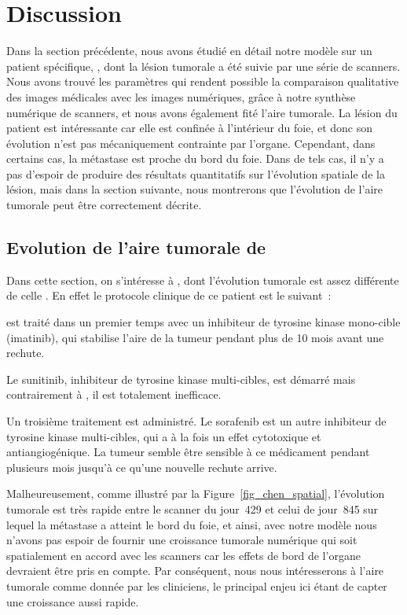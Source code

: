 \documentclass[main.tex]{subfiles}
\begin{document}
\section{Discussion}
Dans la section précédente, nous avons étudié en détail notre modèle sur un patient spécifique, \Nber, dont la lésion tumorale a été suivie par une série de scanners. Nous avons trouvé les paramètres qui rendent possible la comparaison qualitative des images médicales avec les images numériques, grâce à notre synthèse numérique de scanners, et nous avons également fité l'aire tumorale. La lésion du patient est intéressante car elle est confinée à l'intérieur du foie, et donc son évolution n'est pas mécaniquement contrainte par l'organe. 
Cependant, dans certains cas, la métastase est proche du bord du foie. Dans de tels cas, il n'y a pas d'espoir de produire des résultats quantitatifs sur l'évolution spatiale de la lésion, mais dans la section suivante, nous montrerons que l'évolution de l'aire tumorale peut être correctement décrite.
\subsection{Evolution de l'aire tumorale de \Chen}\label{section chen}
Dans cette section, on s'intéresse à \Chen, dont l'évolution tumorale est assez différente de celle \Nber. En effet le protocole clinique de ce patient est le suivant~:
\begin{myenumerate}[label=\roman*)]
\item \Chen est traité dans un premier temps avec un inhibiteur de tyrosine kinase mono-cible (imatinib), qui stabilise l'aire de la tumeur pendant plus de 10 mois avant une rechute. 
\item Le sunitinib, inhibiteur de tyrosine kinase multi-cibles, est démarré mais contrairement à \Nber, il est totalement inefficace. 
\item Un troisième traitement est administré. Le sorafenib est un autre inhibiteur de tyrosine kinase multi-cibles, qui a à la fois un effet cytotoxique et antiangiogénique. La tumeur semble être sensible à ce médicament pendant plusieurs mois jusqu'à ce qu'une nouvelle rechute arrive. 
\end{myenumerate}
Malheureusement, comme illustré par la Figure~\ref{fig_chen_spatial}, l'évolution tumorale est très rapide entre le scanner du jour~429 et celui de jour~845 sur lequel la métastase a atteint le bord du foie, et ainsi, avec notre modèle nous n'avons pas espoir de fournir une croissance tumorale numérique qui soit spatialement en accord avec les scanners car les effets de bord de l'organe devraient être pris en compte. Par conséquent, nous nous intéresserons à  l'aire tumorale comme donnée par les cliniciens, le principal enjeu ici étant de capter une croissance aussi rapide. 
\end{document}
